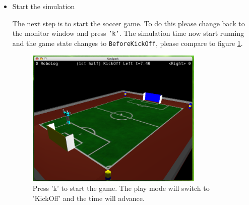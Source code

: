 \begin{itemize}
\item{Start the simulation}

The next step is to start the soccer game. To do this please change
back to the monitor window and press \texttt{'k'}. The simulation time
now start running and the game state changes to
\texttt{BeforeKickOff}, please compare to figure \ref{fig:presskickoff}.

\begin{figure}[htbp]
\begin{center}
\includegraphics[width=0.8\textwidth]{fig/presskickoff}
\caption{Press 'k' to start the game. The play mode will switch to 'KickOff' and the time will advance.}
\label{fig:presskickoff}
\end{center}
\end{figure}

\end{itemize}



